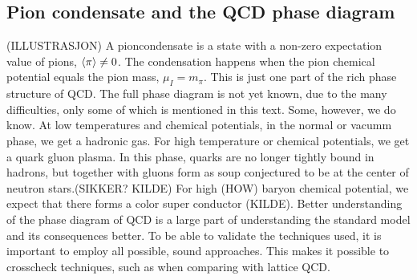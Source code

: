 \subsection*{Pion condensate and the QCD phase diagram}
(ILLUSTRASJON)
A pioncondensate is a state with a non-zero expectation value of pions, $\ex{\pi} \neq 0$.
The condensation happens when the pion chemical potential equals the pion mass, $\mu_I = m_\pi$.
This is just one part of the rich phase structure of QCD.
The full phase diagram is not yet known, due to the many difficulties, only some of which is mentioned in this text.
Some, however, we do know.
At low temperatures and chemical potentials, in the normal or vacumm phase, we get a hadronic gas.
For high temperature or chemical potentials, we get a quark gluon plasma.
In this phase, quarks are no longer tightly bound in hadrons, but together with gluons form as soup conjectured to be at the center of neutron stars.(SIKKER? KILDE)
For high (HOW) baryon chemical potential, we expect that there forms a color super conductor (KILDE).
Better understanding of the phase diagram of QCD is a large part of understanding the standard model and its consequences better.
To be able to validate the techniques used, it is important to employ all possible, sound approaches.
This makes it possible to crosscheck techniques, such as when comparing \chpt with lattice QCD.


